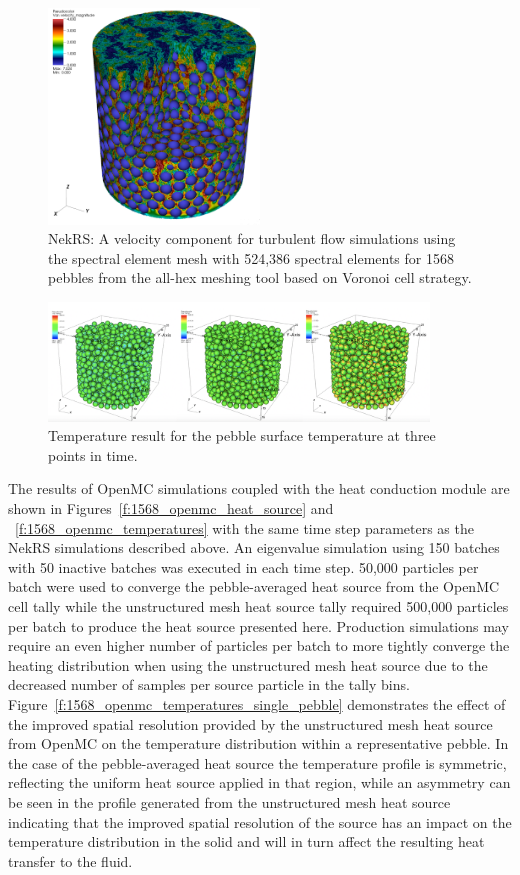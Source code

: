 \begin{figure}[!h]
\centering
\includegraphics[clip=true,width=0.5\textwidth]{Figures/ndemo_r3}
\caption{NekRS: A velocity component for turbulent flow simulations using the spectral element mesh 
with 524,386 spectral elements for 1568 pebbles from the all-hex meshing tool based on Voronoi cell strategy. }
\label{f:ndemo3}
\end{figure}


\begin{figure}[!h]
\centering
\includegraphics[clip=true,width=0.9\textwidth]{Figures/ndemo_r4}
\caption{Temperature result for the pebble surface temperature at three points in time.}
\label{f:ndemo4}
\end{figure}

The results of OpenMC simulations coupled with the heat conduction module are
shown in Figures~\ref{f:1568_openmc_heat_source} and
~\ref{f:1568_openmc_temperatures} with the same time step parameters as the
NekRS simulations described above. An eigenvalue simulation using 150 batches
with 50 inactive batches was executed in each time step. 50,000 particles per
batch were used to converge the pebble-averaged heat source from the OpenMC cell
tally while the unstructured mesh heat source tally required 500,000 particles
per batch to produce the heat source presented here. Production simulations may
require an even higher number of particles per batch to more tightly converge
the heating distribution when using the unstructured mesh heat source due to the
decreased number of samples per source particle in the tally bins.
Figure~\ref{f:1568_openmc_temperatures_single_pebble} demonstrates the effect of
the improved spatial resolution provided by the unstructured mesh heat source
from OpenMC on the temperature distribution within a representative pebble. In
the case of the pebble-averaged heat source the temperature profile is
symmetric, reflecting the uniform heat source applied in that region, while an
asymmetry can be seen in the profile generated from the unstructured mesh heat
source indicating that the improved spatial resolution of the source has an
impact on the temperature distribution in the solid and will in turn affect the
resulting heat transfer to the fluid.

